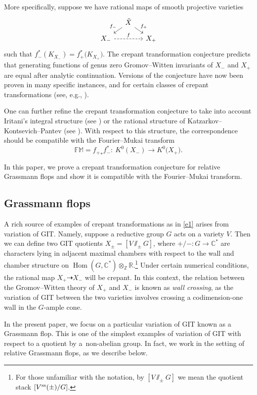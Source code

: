 \documentclass[pdftex]{sigma}
\numberwithin{equation}{section}
\newcommand{\CC}{\mathbb{C}}
\newcommand{\ZZ}{\mathbb{Z}}
\newcommand{\RR}{\mathbb{R}}
\newcommand{\FM}{\mathbb{FM}}
\DeclareMathOperator{\Hom}{Hom}
\begin{document}
More specifically, suppose we have rational maps of smooth projective varieties
\begin{equation}\label{e1}
 \begin{tikzcd}[sep=small]
 & \tilde X \ar[dl, swap, "f_-"] \ar[dr, "f_+"] &\\
 X_- \ar[rr, dashed, "f"] &&X_+
\end{tikzcd}\end{equation}
such that $f_-^*(K_{X_-}) = f_+^*\bigl(K_{X_+}\bigr)$. The crepant transformation conjecture predicts that generating functions of genus zero Gromov--Witten invariants of $X_-$ and $X_+$ are equal after analytic continuation.
Versions of the conjecture have now been proven in many specific instances, and for certain classes of crepant transformations (see, e.g., \cite{BG, CIJ, ILLW, LR}).

One can further refine the crepant transformation conjecture to take into account Iritani's integral structure (see \cite{IriInt}) or the rational structure of Katzarkov--Kontsevich--Pantev (see \cite{KKP}). With respect to this structure, the correspondence should be compatible with the Fourier--Mukai transform
\[
\FM = {f_+}_* f_-^*\colon \ K^0(X_-) \to K^0\bigl(X_+\bigr).
\]

In this paper, we prove a crepant transformation conjecture for relative Grassmann flops and show it is compatible with the Fourier--Mukai transform.


\subsection{Grassmann flops}
A rich source of examples of
crepant transformations as in \eqref{e1}
arises from variation of GIT. Namely, suppose a reductive group $G$ acts on a variety $V$. Then we can define two GIT quotients
$X_\pm = [V\sslash_\pm G]$,
where $+/-\colon G \to \CC^*$ are characters lying in adjacent maximal chambers with respect to the wall and chamber structure on $\Hom( G, \CC^*) \otimes_\ZZ \RR$.\footnote{For those unfamiliar with the notation, by $[V\sslash_\pm G]$ we mean the quotient stack $[V^{\rm ss}(\pm)/ G]$.} Under certain numerical conditions, the rational map $X_+ \dashrightarrow X_-$ will be crepant.
In this context, the relation between the Gromov--Witten theory of $X_+$ and $X_-$ is known as \emph{wall crossing}, as the variation of GIT between the two varieties involves crossing a codimension-one wall in the $G$-ample cone.

In the present paper, we focus on a particular variation of GIT known as a Grassmann flop. This is one of the simplest examples of variation of GIT with respect to a quotient by a~non-abelian group. In fact, we work in the setting of relative Grassmann flops, as we describe below.
\end{document}
